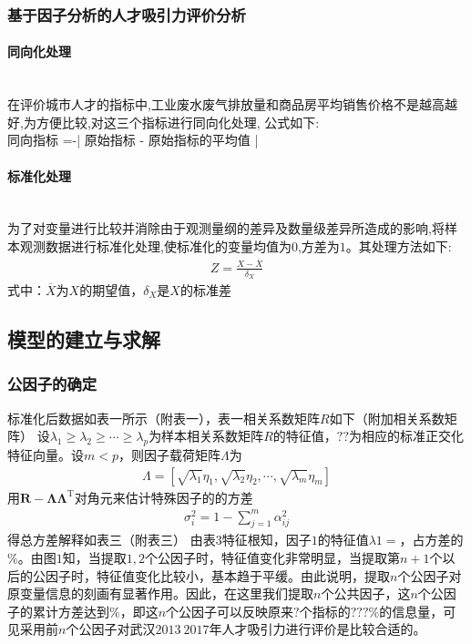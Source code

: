 \documentclass{whutmod}
\begin{document}
		\subsubsection{基于因子分析的人才吸引力评价分析}
		\paragraph{同向化处理}
		~\\ 
		在评价城市人才的指标中,工业废水废气排放量和商品房平均销售价格不是越高越好,为方便比较,对这三个指标进行同向化处理, 公式如下:
		~\\ 同向指标 =-| 原始指标 - 原始指标的平均值 |
		\paragraph{标准化处理}
		~\\
		为了对变量进行比较并消除由于观测量纲的差异及数量级差异所造成的影响,将样本观测数据进行标准化处理,使标准化的变量均值为$0$,方差为$1$。其处理方法如下:
		\begin{gather}
		Z=\frac{X-\overline{X}}{\delta_{X}}
		\end{gather}
		式中：$\overline{X}$为$X$的期望值，$\delta_{X}$是$X$的标准差

	\subsection{模型的建立与求解}
	\subsubsection{公因子的确定}
	标准化后数据如表一所示（附表一），表一相关系数矩阵$R$如下（附加相关系数矩阵）
	设$\lambda_{1} \geqslant \lambda_{2} \geqslant \cdots \geqslant \lambda_{p}$为样本相关系数矩阵$R$的特征值，$??$为相应的标准正交化特征向量。设$m<p$，则因子载荷矩阵$\Lambda$为
	\begin{gather}
	\Lambda=\left[\sqrt{\lambda_{1}} \eta_{1}, \sqrt{\lambda_{2}} \eta_{2}, \cdots, \sqrt{\lambda_{m}} \eta_{m}\right]
	\end{gather}
    用$\boldsymbol{R}-\boldsymbol{\Lambda} \boldsymbol{\Lambda}^{\mathrm{T}}$对角元来估计特殊因子的的方差
	\begin{gather}
	\sigma_{i}^{2}=1-\sum_{j=1}^{m} \alpha_{i j}^{2}
	\end{gather}
	得总方差解释如表三（附表三）
	由表$3$特征根知，因子$1$的特征值$λ1=$，占方差的 $\%$。由图$1$知，当提取$1,2$个公因子时，特征值变化非常明显，当提取第$n+1$个以后的公因子时，特征值变化比较小，基本趋于平缓。由此说明，提取$n$个公因子对原变量信息的刻画有显著作用。因此，在这里我们提取$n$个公共因子，这$n$个公因子的累计方差达到$\%$，即这$n$个公因子可以反映原来$?$个指标的$???\%$的信息量，可见采用前$n$个公因子对武汉$2013~2017$年人才吸引力进行评价是比较合适的。
\end{document}
